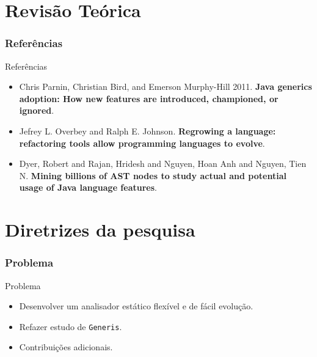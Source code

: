 \documentclass[]{beamer}
\begin{document}
	\section{Revisão Teórica}
	\frametitle{Referências}
	\begin{frame}[label=referencias]
		\begin{block}{Referências}
			\begin{itemize}
				\item Chris Parnin, Christian Bird, and Emerson Murphy-Hill 2011. \textbf{Java generics adoption: How new features are introduced, championed, or ignored}.
				
				\item Jefrey L. Overbey and Ralph E. Johnson. \textbf{Regrowing a language: refactoring tools
				allow programming languages to evolve}.
				
				\item Dyer, Robert and Rajan, Hridesh and Nguyen, Hoan Anh and Nguyen, Tien N. \textbf{Mining billions of AST nodes to study actual and potential usage of Java language features}.
			\end{itemize}
			
		\end{block}
	\end{frame}
	




	\section{Diretrizes da pesquisa}

	\begin{frame}[fragile]\frametitle{Problema}
		\begin{block}{Problema}
			\begin{itemize}
				\item Desenvolver um analisador estático flexível e de fácil evolução.
			
				\item Refazer estudo de \texttt{Generis}.
				
				\item Contribuições adicionais.
			\end{itemize}
		\end{block}
	\end{frame}	
	
\end{document}
